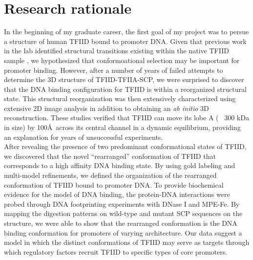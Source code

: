 \section{Research rationale}

In the beginning of my graduate career, the first goal of my project was to persue a structure of human TFIID bound to promoter DNA. Given that previous work in the lab identified structural transitions existing within the native TFIID sample \cite{Grob_1281}, we hypothesized that conformoational selection may be important for promoter binding. However, after a number of years of failed attempts to determine the 3D structure of TFIID-TFIIA-SCP, we were surprised to discover that the DNA binding configuration for TFIID is within a reorganized structural state. This structural reorganization was then extensively characterized using extensive 2D image analysis in addition to obtaining an \emph{ab initio} 3D reconstruction. These studies verified that TFIID can move its lobe A (~ 300 kDa in size) by 100\AA\ across its central channel in a dynamic equilibrium, providing an explanation for years of unsuccessful experiments. \\
\indent After revealing the presence of two predominant conformational states of TFIID, we discovered that the novel “rearranged” conformation of TFIID that corresponds to a high affinity DNA binding state. By using gold labeling and multi-model refinements, we defined the organization of the rearranged conformation of TFIID bound to promoter DNA. To provide biochemical evidence for the model of DNA binding, the protein-DNA interactions were probed through DNA footprinting experiments with DNase I and MPE-Fe. By mapping the digestion patterns on wild-type and mutant SCP sequences on the structure, we were able to show that the rearranged conformation is the DNA binding conformation for promoters of varying architecture. Our data suggest a model in which the distinct conformations of TFIID may serve as targets through which regulatory factors recruit TFIID to specific types of core promoters.\\

